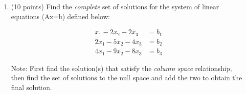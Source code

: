 \documentclass{article}%
\begin{document}
\begin{enumerate}
    

    
    \item (10 points) Find the \emph{complete} set of solutions for the system of linear equations (Ax=b) defined below:

    \begin{align*}
        x_1 -2x_2 -2x_3 &= b_1\\
        2x_1 - 5x_2 -4x_3 &= b_2\\
        4x_1 - 9x_2 -8x_3 &= b_3
    \end{align*}

    Note: First find the solution(s) that satisfy the \emph{column space} relationship, then find the set of solutions to the null space and add the two to obtain the final solution.



\end{enumerate}
\end{document}
